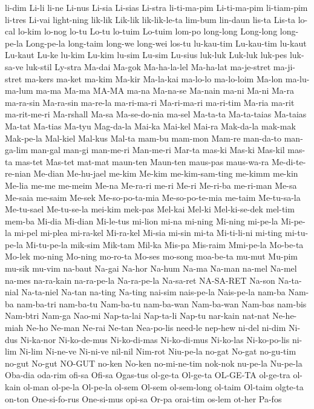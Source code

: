 {li-dim
Li-li
li-ne
Li-nus
Li-sia
Li-sias
Li-stra
li-ti-ma-pim
Li-ti-ma-pim
li-tiam-pim
li-tres
Li-vai
light-ning
lik-lik
Lik-lik
lik-lik-le-ta
lim-bum
lin-daun
lis-ta
Lis-ta
lo-cal
lo-kim
lo-nog
lo-tu
Lo-tu
lo-tuim
Lo-tuim
lom-po
long-long
Long-long
long-pe-la
Long-pe-la
long-taim
long-we
long-wei
los-tu
lu-kau-tim
Lu-kau-tim
lu-kaut
Lu-kaut
Lu-ke
lu-kim
Lu-kim
lu-sim
Lu-sim
Lu-sius
luk-luk
Luk-luk
luk-pes
luk-sa-ve
luk-stil
Ly-stra
Ma-dai
Ma-gok
Ma-ha-la-lel
Ma-ha-lat
ma-je-stret
ma-ji-stret
ma-kers
ma-ket
ma-kim
Ma-kir
Ma-la-kai
ma-lo-lo
ma-lo-loim
Ma-lon
ma-lu-ma-lum
ma-ma
Ma-ma
MA-MA
ma-na
Ma-na-se
Ma-nain
ma-ni
Ma-ni
Ma-ra
ma-ra-sin
Ma-ra-sin
ma-re-la
ma-ri-ma-ri
Ma-ri-ma-ri
ma-ri-tim
Ma-ria
ma-rit
ma-rit-me-ri
Ma-rshall
Ma-sa
Ma-se-do-nia
ma-sel
Ma-ta-ta
Ma-ta-taias
Ma-taias
Ma-tat
Ma-tias
Ma-tyu
Mag-da-la
Mai-ka
Mai-kel
Mai-ra
Mak-da-la
mak-mak
Mak-pe-la
Mal-kiel
Mal-kus
Mal-ta
mam-bu
mam-mon
Mam-re
man-da-to
man-ga-lim
man-gal
man-gi
man-me-ri
Man-me-ri
Mar-ta
mas-ki
Mas-ki
Mas-kil
mas-ta
mas-tet
Mas-tet
mat-mat
maun-ten
Maun-ten
maus-pas
maus-wa-ra
Me-di-te-re-nian
Me-dian
Me-hu-jael
me-kim
Me-kim
me-kim-sam-ting
me-kimm
me-kin
Me-lia
me-me
me-meim
Me-na
Me-ra-ri
me-ri
Me-ri
Me-ri-ba
me-ri-man
Me-sa
Me-saia
me-saim
Me-sek
Me-so-po-ta-mia
Me-so-po-te-mia
me-taim
Me-tu-sa-la
Me-tu-sael
Me-tu-se-la
mei-kim
mek-pas
Mel-kai
Mel-ki
Mel-ki-se-dek
mel-tim
mem-ba
Mi-dia
Mi-dian
Mi-le-tus
mi-lion
mi-na
mi-ning
Mi-ning
mi-pe-la
Mi-pe-la
mi-pel
mi-plea
mi-ra-kel
Mi-ra-kel
Mi-sia
mi-sin
mi-ta
Mi-ti-li-ni
mi-ting
mi-tu-pe-la
Mi-tu-pe-la
mik-sim
Mik-tam
Mil-ka
Mis-pa
Mis-raim
Mmi-pe-la
Mo-be-ta
Mo-lek
mo-ning
Mo-ning
mo-ro-ta
Mo-ses
mo-song
moa-be-ta
mu-mut
Mu-pim
mu-sik
mu-vim
na-baut
Na-gai
Na-hor
Na-hum
Na-ma
Na-man
na-mel
Na-mel
na-mes
na-ra-kain
na-ra-pe-la
Na-ra-pe-la
Na-sa-ret
NA-SA-RET
Na-son
Na-ta-nial
Na-ta-niel
Na-tan
na-ting
Na-ting
nai-sim
nais-pe-la
Nais-pe-la
nam-ba
Nam-ba
nam-ba-tri
nam-ba-tu
Nam-ba-tu
nam-ba-wan
Nam-ba-wan
Nam-bas
nam-bis
Nam-btri
Nam-ga
Nao-mi
Nap-ta-lai
Nap-ta-li
Nap-tu
nar-kain
nat-nat
Ne-he-miah
Ne-ho
Ne-man
Ne-rai
Ne-tan
Nea-po-lis
need-le
nep-hew
ni-del
ni-dim
Ni-dus
Ni-ka-nor
Ni-ko-de-mus
Ni-ko-di-mas
Ni-ko-di-mus
Ni-ko-las
Ni-ko-po-lis
ni-lim
Ni-lim
Ni-ne-ve
Ni-ni-ve
nil-nil
Nim-rot
Niu-pe-la
no-gat
No-gat
no-gu-tim
no-gut
No-gut
NO-GUT
no-ken
No-ken
no-mi-ne-tim
nok-nok
nu-pe-la
Nu-pe-la
Oba-dia
oda-rim
ofi-sa
Ofi-sa
Ogas-tus
ol-ge-ta
Ol-ge-ta
OL-GE-TA
ol-ge-tra
ol-kain
ol-man
ol-pe-la
Ol-pe-la
ol-sem
Ol-sem
ol-sem-long
ol-taim
Ol-taim
olgte-ta
on-ton
One-si-fo-rus
One-si-mus
opi-sa
Or-pa
orai-tim
os-lem
ot-her
Pa-fos
}
